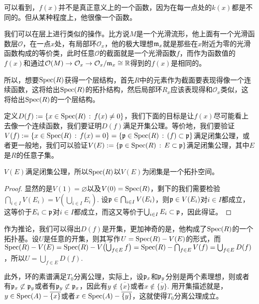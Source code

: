 可以看到，$f(x)$并不是真正意义上的一个函数，因为在每一点处的$k(x)$都是不同的。但从某种程度上，他很像一个函数。

我们可以在层上进行类似的操作。比方说$M$是一个光滑流形，他上面有一个光滑函数层$\mathcal{O}$，在一点$x$处，有局部环$\mathcal{O}_x$，他的极大理想$\mathfrak{m}_x$就是那些在$x$附近为零的光滑函数构成的等价类，此时任意$\mathcal{O}$的截面就是一个光滑函数$f$，而作为函数值的$f(x)$和通过$\mathcal{O}(M)\to \mathcal{O}_x\to \mathcal{O}_x/\mathfrak{m}_x\cong \mathbb{R}$得到的$f(x)$是相同的。

所以，想要$\operatorname{Spec}(R)$获得一个层结构，首先$R$中的元素作为截面要表现得像一个连续函数，这将给出$\operatorname{Spec}(R)$的拓扑结构，然后局部环$R_x$应该表现得和$\mathcal{O}_x$类似，这将给出$\operatorname{Spec}(R)$的一个层结构。

\begin{para}[素谱的拓扑结构]
定义$D(f):=\{x\in \operatorname{Spec}(R)\,:\, f(x)\neq 0\}$，我们下面的目标是让$f(x)$尽可能看上去像一个连续函数，我们要证明$D(f)$满足开集公理。等价地，我们要验证$V(f):=\{x\in \operatorname{Spec}(R)\,:\, f(x)=0\}=\{\mathfrak{p}\in \operatorname{Spec}(R)\,:\, (f)\subset \mathfrak{p}\}$满足闭集公理，或者更一般地，我们可以验证$V(E):=\{\mathfrak{p}\in \operatorname{Spec}(R)\,:\, E\subset \mathfrak{p}\}$满足闭集公理，其中$E$是$R$的任意子集。

\begin{pro}
$V(E)$满足闭集公理，所以$\operatorname{Spec}(R)$以$V(E)$为闭集是一个拓扑空间。
\end{pro}

\begin{proof} 显然的是$V(1)=\varnothing$以及$V(0)=\operatorname{Spec}(R)$，剩下的我们需要检验$\bigcap_{i\in I}V(E_i)=V(\bigcup_{i\in I}E_i)$. 设$\mathfrak{p} \in \bigcap_{i\in I}V(E_i)$，则$\mathfrak{p}\in V(E_i)$对$i\in I$都成立，这等价于$E_i\subset \mathfrak{p}$对$i\in I$都成立，而这又等价于$\bigcup_{i\in I}E_i \subset \mathfrak{p}$，因此得证。\end{proof}

作为推论，我们可以得出$D(f)$是开集，更加神奇的是，他构成了$\operatorname{Spec}(R)$的一个拓扑基。设$U$是任意的开集，则其写作$U=\operatorname{Spec}(R)-V(E)$的形式，而$\operatorname{Spec}(R)-V(E)=\operatorname{Spec}(R)-V\bigl(\bigcup_{f\in E} f\bigr)=\operatorname{Spec}(R)-\bigcap_{f\in E}V(f)=\bigcup_{f\in E}D(f)$，所以$U=\bigcup_{f\in E}D(f)$.

此外，环的素谱满足$T_0$分离公理，实际上，设$\mathfrak{p}_x$和$\mathfrak{p}_y$分别是两个素理想，则或者有$\mathfrak{p}_x\not\subset \mathfrak{p}_y$或者有$\mathfrak{p}_y\not\subset \mathfrak{p}_x$，因此有$y\not\in \overline{\{x\}}$或者$x\not\in \overline{\{y\}}$. 用开集描述就是，$y\in \operatorname{Spec}(A)-\overline{\{x\}}$或者$x\in \operatorname{Spec}(A)-\overline{\{y\}}$，这就使得$T_0$分离公理成立。
\end{para}

